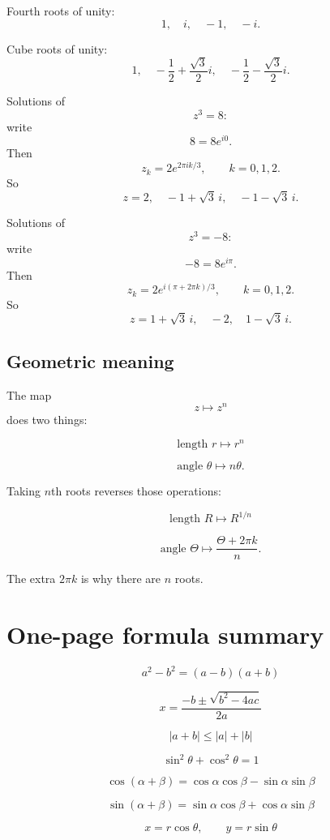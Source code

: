 Fourth roots of unity:
\[
\boxed{
    1,\quad i,\quad -1,\quad -i.
}
\]

Cube roots of unity:
\[
\boxed{
    1,\quad
    -\frac12+\frac{\sqrt3}{2}i,\quad
    -\frac12-\frac{\sqrt3}{2}i.
}
\]

Solutions of
\[
    z^3=8:
\]
write
\[
    8=8e^{i0}.
\]
Then
\[
    z_k=2e^{2\pi i k/3},
    \qquad
    k=0,1,2.
\]
So
\[
\boxed{
    z=2,\quad
    -1+\sqrt3\,i,\quad
    -1-\sqrt3\,i.
}
\]

Solutions of
\[
    z^3=-8:
\]
write
\[
    -8=8e^{i\pi}.
\]
Then
\[
    z_k=2e^{i(\pi+2\pi k)/3},
    \qquad
    k=0,1,2.
\]
So
\[
\boxed{
    z=1+\sqrt3\,i,\quad
    -2,\quad
    1-\sqrt3\,i.
}
\]

\subsection*{Geometric meaning}

The map
\[
    z\mapsto z^n
\]
does two things:

\[
\boxed{
    \text{length } r \mapsto r^n
}
\]

\[
\boxed{
    \text{angle } \theta \mapsto n\theta.
}
\]

Taking \(n\)th roots reverses those operations:

\[
\boxed{
    \text{length } R \mapsto R^{1/n}
}
\]

\[
\boxed{
    \text{angle } \Theta \mapsto \frac{\Theta+2\pi k}{n}.
}
\]

The extra \(2\pi k\) is why there are \(n\) roots.

\section*{One-page formula summary}

\[
\boxed{
    a^2-b^2=(a-b)(a+b)
}
\]

\[
\boxed{
    x=\frac{-b\pm\sqrt{b^2-4ac}}{2a}
}
\]

\[
\boxed{
    |a+b|\le |a|+|b|
}
\]

\[
\boxed{
    \sin^2\theta+\cos^2\theta=1
}
\]

\[
\boxed{
    \cos(\alpha+\beta)
    =
    \cos\alpha\cos\beta-\sin\alpha\sin\beta
}
\]

\[
\boxed{
    \sin(\alpha+\beta)
    =
    \sin\alpha\cos\beta+\cos\alpha\sin\beta
}
\]

\[
\boxed{
    x=r\cos\theta,\qquad y=r\sin\theta
}
\]

